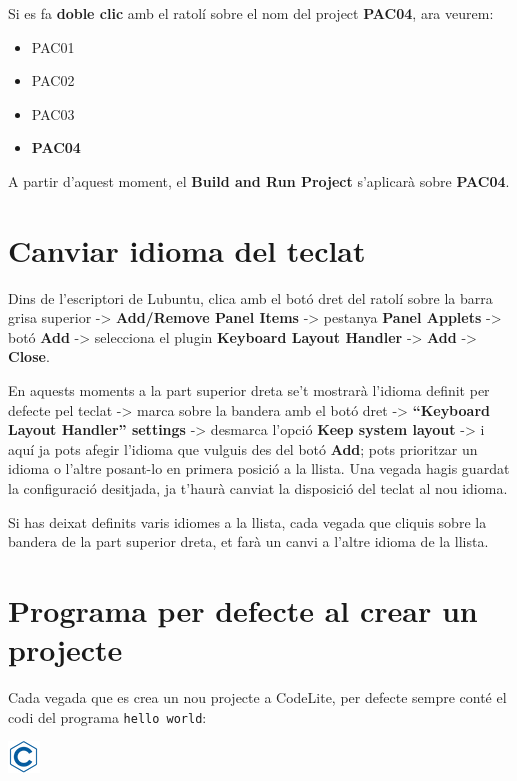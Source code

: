 \documentclass[]{book}
\providecommand{\tightlist}{%
  \setlength{\itemsep}{0pt}\setlength{\parskip}{0pt}}
\begin{document}
Si es fa \textbf{doble clic} amb el ratolí sobre el nom del project
\textbf{PAC04}, ara veurem:

\begin{itemize}
\tightlist
\item
  PAC01
\item
  PAC02
\item
  PAC03
\item
  \textbf{PAC04}
\end{itemize}

A partir d'aquest moment, el \textbf{Build and Run Project} s'aplicarà
sobre \textbf{PAC04}.

\section{Canviar idioma del teclat}\label{canviar-idioma-del-teclat}

Dins de l'escriptori de Lubuntu, clica amb el botó dret del ratolí sobre
la barra grisa superior -\textgreater{} \textbf{Add/Remove Panel Items}
-\textgreater{} pestanya \textbf{Panel Applets} -\textgreater{} botó
\textbf{Add} -\textgreater{} selecciona el plugin \textbf{Keyboard
Layout Handler} -\textgreater{} \textbf{Add} -\textgreater{}
\textbf{Close}.

En aquests moments a la part superior dreta se't mostrarà l'idioma
definit per defecte pel teclat -\textgreater{} marca sobre la bandera
amb el botó dret -\textgreater{} \textbf{``Keyboard Layout Handler''
settings} -\textgreater{} desmarca l'opció \textbf{Keep system layout}
-\textgreater{} i aquí ja pots afegir l'idioma que vulguis des del botó
\textbf{Add}; pots prioritzar un idioma o l'altre posant-lo en primera
posició a la llista. Una vegada hagis guardat la configuració desitjada,
ja t'haurà canviat la disposició del teclat al nou idioma.

Si has deixat definits varis idiomes a la llista, cada vegada que
cliquis sobre la bandera de la part superior dreta, et farà un canvi a
l'altre idioma de la llista.

\section{Programa per defecte al crear un
projecte}\label{programa-per-defecte-al-crear-un-projecte}

Cada vegada que es crea un nou projecte a CodeLite, per defecte sempre
conté el codi del programa \texttt{hello\ world}:

\includegraphics{./img/c.png}
\end{document}
